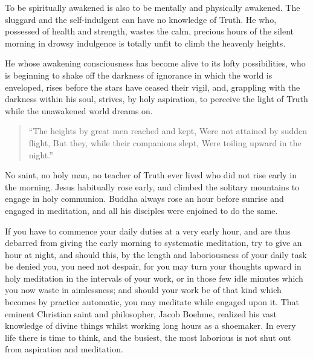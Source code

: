 \documentclass[12pt,oneside]{scrbook}
\begin{document}
  To be spiritually awakened is also to be mentally and physically
  awakened. The sluggard and the self-indulgent can have no knowledge of
  Truth. He who, possessed of health and strength, wastes the calm,
  precious hours of the silent morning in drowsy indulgence is totally
  unfit to climb the heavenly heights.
  
  He whose awakening consciousness has become alive to its lofty
  possibilities, who is beginning to shake off the darkness of ignorance
  in which the world is enveloped, rises before the stars have ceased
  their vigil, and, grappling with the darkness within his soul, strives,
  by holy aspiration, to perceive the light of Truth while the unawakened
  world dreams on.
  
  \begin{quote}
  ``The heights by great men reached and kept, Were not attained by sudden
  flight, But they, while their companions slept, Were toiling upward in
  the night.''
  \end{quote}
  
  No saint, no holy man, no teacher of Truth ever lived who did not rise
  early in the morning. Jesus habitually rose early, and climbed the
  solitary mountains to engage in holy communion. Buddha always rose an
  hour before sunrise and engaged in meditation, and all his disciples
  were enjoined to do the same.
  
  If you have to commence your daily duties at a very early hour, and are
  thus debarred from giving the early morning to systematic meditation,
  try to give an hour at night, and should this, by the length and
  laboriousness of your daily task be denied you, you need not despair,
  for you may turn your thoughts upward in holy meditation in the
  intervals of your work, or in those few idle minutes which you now waste
  in aimlessness; and should your work be of that kind which becomes by
  practice automatic, you may meditate while engaged upon it. That eminent
  Christian saint and philosopher, Jacob Boehme, realized his vast
  knowledge of divine things whilst working long hours as a shoemaker. In
  every life there is time to think, and the busiest, the most laborious
  is not shut out from aspiration and meditation.
  
\end{document}
